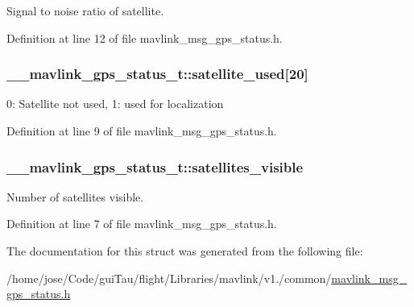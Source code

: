 Signal to noise ratio of satellite. 



Definition at line 12 of file mavlink\-\_\-msg\-\_\-gps\-\_\-status.\-h.

\hypertarget{struct____mavlink__gps__status__t_a84d55d0f78f60eecf76ee27767a80695}{
\subsubsection[{satellite\-\_\-used}]{ \-\_\-\-\_\-mavlink\-\_\-gps\-\_\-status\-\_\-t\-::satellite\-\_\-used\mbox{[}20\mbox{]}}}\label{struct____mavlink__gps__status__t_a84d55d0f78f60eecf76ee27767a80695}


0\-: Satellite not used, 1\-: used for localization 



Definition at line 9 of file mavlink\-\_\-msg\-\_\-gps\-\_\-status.\-h.

\hypertarget{struct____mavlink__gps__status__t_aaf907a0b7ca1bf692b59b3c07269a72d}{
\subsubsection[{satellites\-\_\-visible}]{ \-\_\-\-\_\-mavlink\-\_\-gps\-\_\-status\-\_\-t\-::satellites\-\_\-visible}}\label{struct____mavlink__gps__status__t_aaf907a0b7ca1bf692b59b3c07269a72d}


Number of satellites visible. 



Definition at line 7 of file mavlink\-\_\-msg\-\_\-gps\-\_\-status.\-h.



The documentation for this struct was generated from the following file\-:\begin{DoxyCompactItemize}
\item 
/home/jose/\-Code/gui\-Tau/flight/\-Libraries/mavlink/v1./common/\hyperlink{mavlink__msg__gps__status_8h}{mavlink\-\_\-msg\-\_\-gps\-\_\-status.\-h}\end{DoxyCompactItemize}
